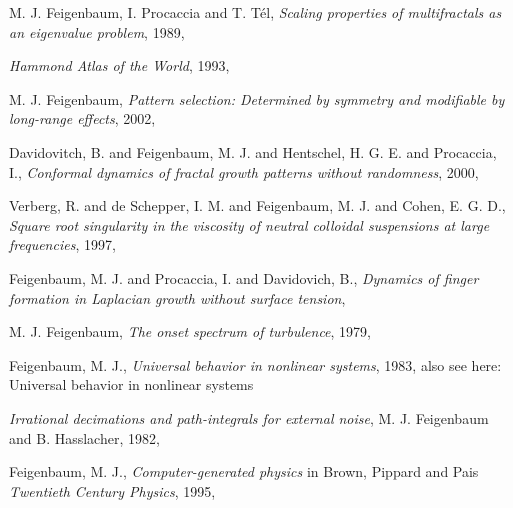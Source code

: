 {M. J. Feigenbaum, I. Procaccia and T. T{\'e}l},
  {\em Scaling properties of multifractals as an eigenvalue problem},
{1989},

{\em Hammond Atlas of the World},
{1993},

{M. J. Feigenbaum},
{\em Pattern selection: {Determined} by symmetry and modifiable by long-range effects},
{2002},

{Davidovitch, B. and Feigenbaum, M. J. and Hentschel, H. G. E. and Procaccia, I.},
  {\em Conformal dynamics of fractal growth patterns without randomness},
{2000},

{Verberg, R. and de Schepper, I. M. and Feigenbaum, M. J. and Cohen, E. G. D.},
  {\em Square root singularity in the viscosity of neutral colloidal suspensions at large frequencies},
{1997},

{Feigenbaum, M. J. and Procaccia, I. and Davidovich, B.},
  {\em Dynamics of finger formation in {Laplacian} growth without surface tension},

{M. J. Feigenbaum},
{\em The onset spectrum of turbulence},
{1979},

{Feigenbaum, M. J.},
{\em Universal behavior in nonlinear systems},
{1983},
also see here:
{Universal behavior in nonlinear systems}

{\em Irrational decimations and path-integrals for external noise},
{M. J. Feigenbaum and B. Hasslacher},
{1982},

{Feigenbaum, M. J.},
{\em Computer-generated physics}
 in {Brown, Pippard  and Pais}
{\em {Twentieth Century Physics}},
{1995},

